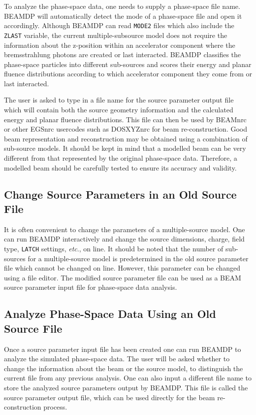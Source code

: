 \documentclass[12pt,twoside]{article}
\newcommand{\etc}{{\em etc}}
\begin{document}
To analyze the phase-space data, one needs to supply a phase-space file
name. BEAMDP will automatically detect the mode of a phase-space file and
open it accordingly. Although BEAMDP can read {\tt MODE2} files which also
include the {\tt ZLAST} variable, the current multiple-subsource model
does not require the information about the z-position within an
accelerator component where the bremsstrahlung photons are created or last
interacted. BEAMDP classifies the phase-space particles into different
sub-sources and scores their energy and planar fluence distributions
according to which accelerator component they come from or last
interacted.

The user is asked to type in a file name for the source parameter output
file which will contain both the source geometry information and the
calculated energy and planar fluence distributions. This file can then be
used by BEAMnrc or other EGSnrc usercodes such as DOSXYZnrc for beam
re-construction. Good beam representation and reconstruction may be
obtained using a combination of sub-source models. It should be kept in
mind that a modelled beam can be very different from that represented by
the original phase-space data. Therefore, a modelled beam should be
carefully tested to ensure its accuracy and validity.

\subsection{Change Source Parameters in an Old Source File}
It is often convenient to change the parameters of a multiple-source
model. One can run BEAMDP interactively and change the source dimensions,
charge, field type, {\tt LATCH} settings, \etc., on line. It should be
noted that the number of sub-sources for a multiple-source model is
predetermined in the old source parameter file which cannot be changed  on
line. However, this parameter can be changed using a file editor. The
modified source parameter file can be used as a BEAM source parameter
input file for phase-space data analysis.

\subsection{Analyze Phase-Space Data Using an Old Source File}
Once a source parameter input file has been created one can run BEAMDP to
analyze the simulated phase-space data. The user will be asked whether to
change the information about the beam or the source model, to distinguish
the current file from any previous analysis. One can also input a
different file name to store the analyzed source parameters output  by
BEAMDP.  This file is called the source parameter output file, which can
be used directly for the beam re-construction process.
\end{document}
